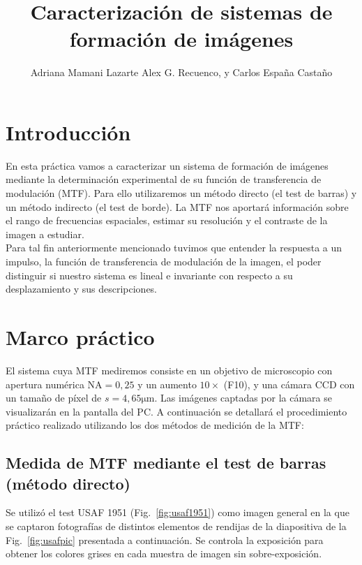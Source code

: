 \documentclass{./packages/optica-article}
\begin{document}
\title{Caracterización de sistemas de formación de imágenes}

\author{Adriana Mamani Lazarte Alex G. Recuenco, y Carlos España Castaño}

\address{Universidad Complutense de Madrid, Madrid, CP 28040, España}

\section{Introducción}
En esta práctica vamos a caracterizar un sistema de formación de imágenes mediante la determinación experimental de su función de transferencia de modulación (MTF). Para ello utilizaremos un método directo (el test de barras) y un método indirecto (el test de borde). La MTF nos aportará información sobre el rango de frecuencias espaciales, estimar su resolución y el contraste de la imagen a estudiar.\\
Para tal fin anteriormente mencionado tuvimos que entender la respuesta a un impulso, la función de transferencia de modulación de la imagen, el poder distinguir si nuestro sistema es lineal e invariante con respecto a su desplazamiento y sus descripciones.

\section{Marco práctico}
El sistema cuya MTF mediremos consiste en un objetivo de microscopio con apertura numérica $\textrm{NA} = 0,25$ y un aumento $10\times$ (F10),
y una cámara CCD con un tamaño de píxel de $s=4,65 \unit{\micro\meter}$.
Las imágenes captadas por la cámara se visualizarán en la pantalla del PC.
A continuación se detallará el procedimiento práctico realizado utilizando los dos métodos de medición de la MTF: \\
\subsection{Medida de MTF mediante el test de barras (método directo)}\label{sec:metodo-directo}

Se utilizó el test USAF 1951 (Fig.~\ref{fig:usaf1951}) como imagen general en la que se captaron fotografías de  distintos elementos de rendijas de la diapositiva de la Fig.~\ref{fig:usafpic} presentada a continuación. Se controla la exposición para obtener los colores grises en cada muestra de imagen sin sobre-exposición.
\end{document}
